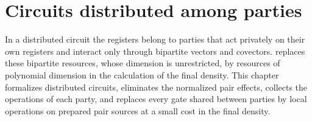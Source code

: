 \chapter{Circuits distributed among parties}
\label{ch:party_circuits}

In a distributed circuit the registers belong to parties that act privately on
their own registers and interact only through bipartite vectors and covectors.
\cite[Section~5]{OpenAI2026PolynomialPEPS} replaces these bipartite resources,
whose dimension is unrestricted, by resources of polynomial dimension in the
calculation of the final density. This chapter formalizes distributed circuits,
eliminates the normalized pair effects, collects the operations of each
party, and replaces every gate shared between parties by local operations on
prepared pair sources at a small cost in the final density.
















